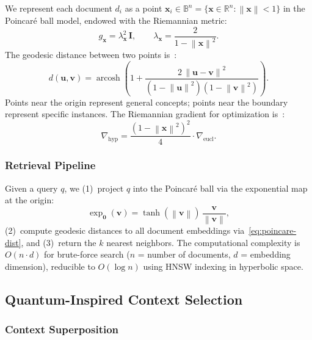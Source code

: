 \documentclass[11pt,letterpaper]{article}
\newcommand{\R}{\mathbb{R}}
\newcommand{\B}{\mathbb{B}}
\newcommand{\norm}[1]{\left\|#1\right\|}
\begin{document}
We represent each document $d_i$ as a point
$\mathbf{x}_i \in \B^n = \{\mathbf{x} \in \R^n : \norm{\mathbf{x}} < 1\}$
in the Poincar\'{e} ball model, endowed with the Riemannian metric:
\begin{equation}
  g_{\mathbf{x}} = \lambda_{\mathbf{x}}^{2}\,\mathbf{I},
  \qquad
  \lambda_{\mathbf{x}} = \frac{2}{1 - \norm{\mathbf{x}}^{2}}.
  \label{eq:conformal}
\end{equation}
The geodesic distance between two points
is~\citep{nickel2017poincare}:
\begin{equation}
  d(\mathbf{u}, \mathbf{v}) =
    \operatorname{arcosh}\!\left(
      1 + \frac{2\,\norm{\mathbf{u} - \mathbf{v}}^{2}}
               {(1 - \norm{\mathbf{u}}^{2})(1 - \norm{\mathbf{v}}^{2})}
    \right).
  \label{eq:poincare-dist}
\end{equation}
Points near the origin represent general concepts; points near the
boundary represent specific instances.
The Riemannian gradient for optimization
is~\citep[Supplementary Eq.~S7]{nickel2017poincare}:
\begin{equation}
  \nabla_{\mathrm{hyp}} =
    \frac{(1 - \norm{\mathbf{x}}^{2})^{2}}{4}
    \cdot \nabla_{\mathrm{eucl}}.
  \label{eq:riemannian-grad}
\end{equation}

\subsubsection{Retrieval Pipeline}

Given a query $q$, we (1)~project $q$ into the Poincar\'{e} ball via the
exponential map at the origin:
\begin{equation}
  \exp_{\mathbf{0}}(\mathbf{v}) =
    \tanh(\norm{\mathbf{v}})\,
    \frac{\mathbf{v}}{\norm{\mathbf{v}}},
  \label{eq:expmap}
\end{equation}
(2)~compute geodesic distances to all document embeddings
via~\eqref{eq:poincare-dist}, and
(3)~return the $k$ nearest neighbors.
The computational complexity is $O(n \cdot d)$ for brute-force search
($n$ = number of documents, $d$ = embedding dimension), reducible to
$O(\log n)$ using HNSW indexing in hyperbolic space.

\subsection{Quantum-Inspired Context Selection}
\label{sec:quantum}

\subsubsection{Context Superposition}
\end{document}
